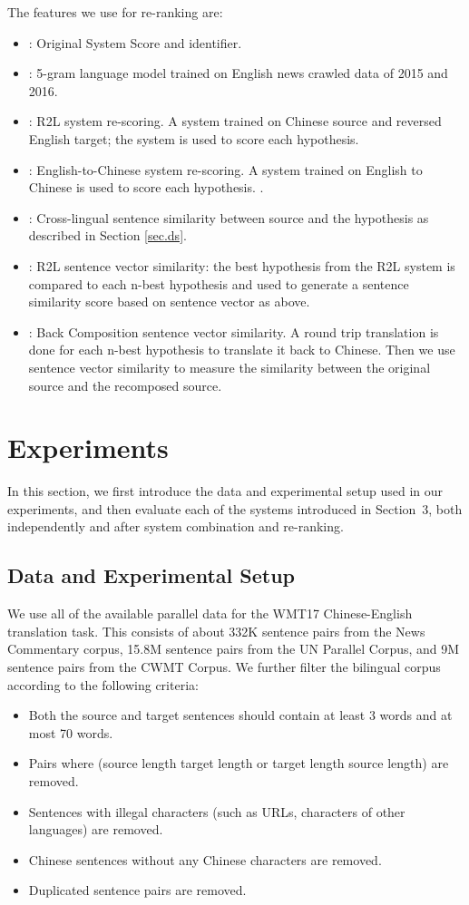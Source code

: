\documentclass[a4paper]{article}
\begin{document}
\begin{CJK*}{UTF8}{gbsn}
The features we use for re-ranking are:
\begin{itemize}
\item : Original System Score and identifier. 
\item : 5-gram language model trained on English news crawled data of 2015 and 2016. 
\item : R2L system re-scoring. A system trained on Chinese source and reversed English target; the system is used to score each hypothesis.
\item  : English-to-Chinese  system re-scoring. A system trained on English to Chinese is used to score each hypothesis. .
\item  : Cross-lingual sentence similarity between source and the hypothesis as described in Section \ref{sec.ds}. 
\item : R2L sentence vector similarity: the best hypothesis from the R2L system is compared to each n-best hypothesis and used to generate a sentence similarity score based on sentence vector as above.
\item   : Back Composition  sentence vector similarity.  A round trip translation is done for each n-best hypothesis to translate it back to Chinese. Then we use sentence vector similarity to measure the similarity between the original source and the recomposed source.
\end{itemize}
 
\section{Experiments}
\label{sec:experiments}


In this section, we first introduce the data and experimental setup used in our experiments, and then evaluate each of the systems introduced in Section~3, both independently and after system combination and re-ranking.

\subsection{Data and Experimental Setup}
We use all of the available parallel data for the WMT17 Chinese-English translation task. This consists of about 332K sentence pairs from the News Commentary corpus, 15.8M sentence pairs from the UN Parallel Corpus, and 9M sentence pairs from the CWMT Corpus. We further filter the bilingual corpus according to the following criteria:
\begin{itemize}
\item Both the source and target sentences should contain at least 3 words and at most 70 words.
\item Pairs where (source length target length or target length source length) are removed.
\item Sentences with illegal characters (such as URLs, characters of other languages) are removed. 
\item Chinese sentences without any Chinese characters are removed.
\item Duplicated sentence pairs are removed.
\end{itemize}


\end{CJK*}
\end{document}

